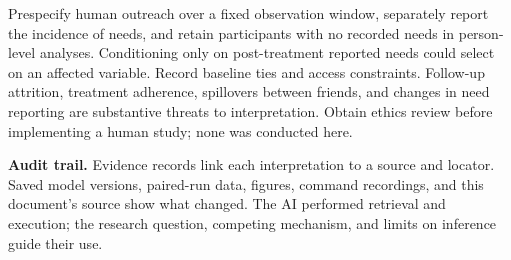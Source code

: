 \documentclass[11pt]{article}
\begin{document}
Prespecify human outreach over a fixed observation window, separately report the incidence of needs, and retain participants with no recorded needs in person-level analyses. Conditioning only on post-treatment reported needs could select on an affected variable. Record baseline ties and access constraints. Follow-up attrition, treatment adherence, spillovers between friends, and changes in need reporting are substantive threats to interpretation. Obtain ethics review before implementing a human study; none was conducted here.

\textbf{Audit trail.} Evidence records link each interpretation to a source and locator. Saved model versions, paired-run data, figures, command recordings, and this document's source show what changed. The AI performed retrieval and execution; the research question, competing mechanism, and limits on inference guide their use.
\newpage
\small
\end{document}
